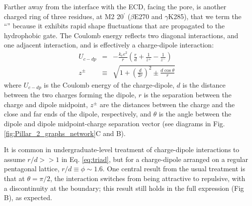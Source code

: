 \documentclass[9pt,twocolumn,twoside,lineno]{pnas-new}
\begin{document}
Farther away from the interface with the ECD, facing the pore, is another charged ring of three residues, at M2 20$^{\prime}$ ($\beta$E270 and $\gamma$K285), that we term the ``\triad'' because it exhibits rapid shape fluctuations that are propagated to the hydrophobic gate.  The Coulomb energy reflects two diagonal interactions, and one adjacent interaction, and is effectively a charge-dipole interaction: %
\begin{eqnarray}
U_{c-dp} &=&- { \frac{k_{e} e^{2}}{r}}\left(\frac{r}{d} + \frac{1}{z^{+}} 
- \frac{1}{z^{-}}\right)\label{eq:triad} \\ 
  z^{\pm}&\equiv&\sqrt{{1+\left(\frac{d}{2 r}\right)^{2} \pm  \frac{ d\cos \theta}{r} }}
\end{eqnarray}
where $U_{c-dp}$ is the Coulomb energy of the charge-dipole, $d$ is the distance between the two charges forming the dipole, $r$ is the separation between the charge and dipole midpoint, $z^{\pm}$ are the distances between the charge and the close and far ends of the dipole, respectively, and $\theta$ is the angle between the dipole and dipole midpoint-charge separation vector (see diagrams in Fig. \ref{fig:Pillar_2_graphs_network}C and \sFigEnergy B). 

It is common in undergraduate-level treatment of charge-dipole interactions to assume $r/d>> 1$ in Eq. \ref{eq:triad}, but for a charge-dipole arranged on a regular pentagonal lattice,  $r/d \equiv \phi \sim1.6$.  One central result from the usual treatment is that at $\theta = \pi/2$, the interaction switches from being attractive to repulsive, with a discontinuity at the boundary; this result still holds in the full expression (Fig \sFigEnergy B), 
as expected.  
\end{document}
